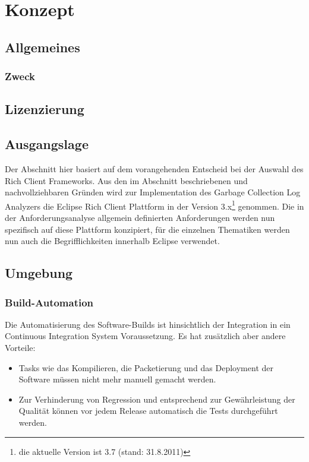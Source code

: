 \chapter{Konzept}
\section{Allgemeines}
\subsection{Zweck}

\section{Lizenzierung}


\section{Ausgangslage}
Der Abschnitt hier basiert auf dem vorangehenden Entscheid bei der Auswahl des Rich Client Frameworks. Aus den im Abschnitt  beschriebenen und nachvollziehbaren Gründen wird zur Implementation des Garbage Collection Log Analyzers die Eclipse Rich Client Plattform in der Version 3.x\footnote{die aktuelle Version ist 3.7 (stand: 31.8.2011)} genommen. Die in der Anforderungsanalyse allgemein definierten Anforderungen werden nun spezifisch auf diese Plattform konzipiert, für die einzelnen Thematiken werden nun auch die Begrifflichkeiten innerhalb Eclipse verwendet.


\section{Umgebung}
\subsection{Build-Automation}
Die Automatisierung des Software-Builds ist hinsichtlich der Integration in ein Continuous Integration System Voraussetzung. Es hat zusätzlich aber andere Vorteile:
\begin{itemize}
	\item Tasks wie das Kompilieren, die Packetierung und das Deployment der Software müssen nicht mehr manuell gemacht werden.
	\item Zur Verhinderung von Regression und entsprechend zur Gewährleistung der Qualität können vor jedem Release automatisch die Tests durchgeführt werden.
\end{itemize}


